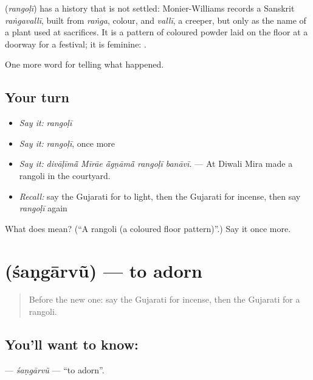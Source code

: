 \begin{cousinweb}
\textbf{} (\emph{rangoḷī}) has a history that is not settled: Monier-Williams records a Sanskrit \emph{raṅgavallī}, built from \emph{raṅga}, colour, and \emph{vallī}, a creeper, but only as the name of a plant used at sacrifices. It is a pattern of coloured powder laid on the floor at a doorway for a festival; it is feminine: \textbf{ }.
\end{cousinweb}

\begin{grammarlens}[title={What you've built}]
One more word for telling what happened.
\end{grammarlens}

\subsection*{Your turn}
\begin{itemize}
\raggedright
  \item \emph{Say it:} \emph{rangoḷī}
  \item \emph{Say it:} \emph{rangoḷī}, once more
  \item \emph{Say it:} \emph{divāḷīmā̃ Mīrāe ā̃gṇāmā̃ rangoḷī banāvī.} — At Diwali Mira made a rangoli in the courtyard.
  \item \emph{Recall:} say the Gujarati for to light, then the Gujarati for incense, then say \emph{rangoḷī} again
\end{itemize}

\begin{tcolorbox}[breakable,colback=teal!4,colframe=teal!35!black,title={Before you move on}]
What does  mean? (\textquotedblleft{}A rangoli (a coloured floor pattern)\textquotedblright{}.) Say it once more.
\end{tcolorbox}
\section[\texorpdfstring{\gu{શણગારવું} (śaṇgārvũ)}{શણગારવું (śaṇgārvũ)}]{ (śaṇgārvũ) — to adorn}

\label{lesson:GU-C329-sangarvu}



\begin{quote}
Before the new one: say the Gujarati for incense, then the Gujarati for a rangoli.
\end{quote}

\subsection*{You'll want to know: }
\textbf{} — \emph{śaṇgārvũ} — \textquotedblleft{}to adorn\textquotedblright{}.

